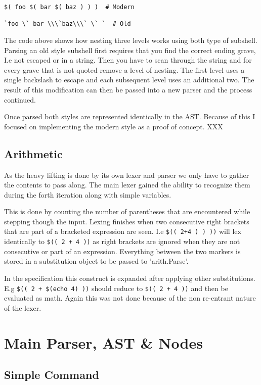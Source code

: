 \begin{verbatim}
$( foo $( bar $( baz ) ) )  # Modern

`foo \` bar \\\`baz\\\` \` `  # Old
\end{verbatim}
The code above shows how nesting three levels works using both type of subshell.
Parsing an old style subshell first requires that you find the correct ending grave, I.e not escaped or in a string.
Then you have to scan through the string and for every grave that is not quoted remove a level of nesting.
The first level uses a single backslash to escape and each subsequent level uses an additional two.
The result of this modification can then be passed into a new parser and the process continued.

Once parsed both styles are represented identically in the AST.
Because of this I focused on implementing the modern style as a proof of concept.
XXX

\subsection{Arithmetic} \label{sec:main-lexer-arith}
As the heavy lifting is done by its own lexer and parser we only have to gather the contents to pass along.
The main lexer gained the ability to recognize them during the forth iteration along with simple variables.

This is done by counting the number of parentheses that are encountered while stepping though the input.
Lexing finishes when two consecutive right brackets that are part of a bracketed expression are seen.
I.e \verb!$(( 2+4 ) ) ))! will lex identically to \verb!$(( 2 + 4 ))! as right brackets are ignored when they are not consecutive or part of an expression.
Everything between the two markers is stored in a substitution object to be passed to 'arith.Parse'.

In the specification this construct is expanded after applying other substitutions.
E.g \verb!$(( 2 + $(echo 4) ))! should reduce to \verb!$(( 2 + 4 ))! and then be evaluated as math.
Again this was not done because of the non re-entrant nature of the lexer.

\section{Main Parser, AST \& Nodes}

\subsection{Simple Command}
